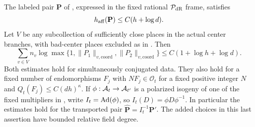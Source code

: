\begin{proposition}\label{ht:coordinates}
The labeled pair $\mathbf P$ of , expressed
in the fixed rational $\mathcal P_{\rm dR}$ frame, satisfies
\begin{equation}\label{ht:global-coordinates}
 h_{\rm aff}(\mathbf P)\leq C(h+\log d).
\end{equation}
Let $V$ be any subcollection of sufficiently close places in the
actual center branches, with bad-center places excluded as in
. Then
\begin{equation}\label{ht:near-coordinates}
 \sum_{v\in V}n_v\log\max\{1,\|P_1\|_{v,\mathrm{coord}},
                                  \|P_2\|_{v,\mathrm{coord}}\}
       \leq C(1+\log h+\log d).
\end{equation}
Both estimates hold for simultaneously conjugated data. They also
hold for a fixed number of endomorphisms $F_j$ with
$NF_j\in\mathcal O_t$ for a fixed positive integer $N$ and
$Q_t(F_j)\leq C(dh)^\kappa$.
If $\phi:\mathcal A_t\to\mathcal A_{t'}$ is a polarized isogeny of one of the
fixed multipliers in , write $I_t=\operatorname{Ad}(\phi)$,
so $I_t(D)=\phi D\phi^{-1}$. In particular the estimates hold for
the transported pair $\widehat{\mathbf P}=I_t^{-1}\mathbf P'$.
The added choices in this last assertion have bounded relative field
degree.
\end{proposition}

